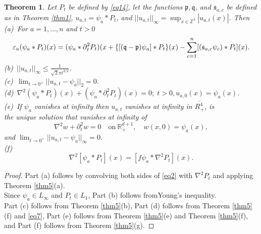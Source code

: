 \documentclass[english, reqno]{amsart}
\newtheorem{thm}{Theorem}[]
\newcommand{\del}{\mbox{$\partial$}}
\newcommand{\IR}{\text{${\mathbb{R}}$}}
\newcommand{\IZ}{\text{${\mathbb{Z}}$}}
\newcommand{\p}{\mathfrak{p}}
\newcommand{\q}{\mathfrak{q}}
\newcommand{\s}{\mathfrak{s}}
\begin{document}
\begin{thm} \label{thm6}
Let  $P_t$ be defined by \eqref{eq14}, let the functions $\p, \q$, and $\s_{a,c}$ be defined as in Theorem \ref{thm1}, 
 $ u_{a,t}=\psi_a \ast P_t$, and $||u_{a,t}||_{\infty}=\sup_{x \in \IZ^3}|u_{a,t}(x)|$.
Then\\
\noindent \textup(a)\ For $a=1, \dots, n$ and $t>0$
\begin{equation*}  %
\varepsilon_a (\psi_a \ast P_t)(x)=(\psi_a \ast \del_t^2P_t)(x +\{[(\q-\p)\psi_a] \ast P_t\}(x)  -\sum_{c=1}^n [(\s_{a,c} \psi_c )\ast P_t](x). \\
\end{equation*}
\textup(b)\ \indent $||u_{a,t}||_{\infty}  \le \displaystyle\frac{1}{\sqrt{2} \pi t^{3/2}}$.\\
\textup(c)\  \indent $\lim_{t \rightarrow 0^+} ||u_{a,t}-\psi_a||_2=0.$\\
\textup(d)\ \indent $\displaystyle{ \nabla^2(\psi_a \ast P_t)(x)+(\psi_a \ast \del_t^2 P_t)(x)=0;\;  t >0, u_{a,0}(x)=\psi_a(x)}$.\\
\textup(e)\ \indent If $\psi_a$  vanishes at infinity then $u_{a,t}$ vanishes at infinity in $\overline{R_+^4}$, is\\ 
\indent \indent the unique solution that vanishes at infinity of
\[
\nabla^2 w+\del^2_t w=0 \quad \text{on}\ \IR_+^{d+1}, \quad w(x,0)=\psi_a(x),
\]
\quad\quad  and $\lim_{t \rightarrow 0^+} ||u_{a,t}-\psi_a||_{\infty}=0.$\\
\textup(f)
\[
\nabla^2[\psi_a\ast P_t](x)= [f\psi_a\ast \nabla^2 P_t](x).
\]
\end{thm}
\begin{proof}  
Part (a) follows by convolving both sides of \eqref{eq2} with $\nabla^2P_t$ and applying Theorem \ref{thm5}(a).\\
Since $\psi_a \in L_{\infty}$ and $P_t \in L_1$, Part (b) follows fromYoung's inequality. \\
Part (c) follows  from Theorem \ref{thm5}(b), Part (d) follows from Theorem \ref{thm5}(f) and \eqref{eq7},
Part (e) follows from Theorem \ref{thm5}(e) and Theorem \ref{thm5}(f), and 
Part (f) follows from Theorem \ref{thm5}(g).
\end{proof}
\end{document}
